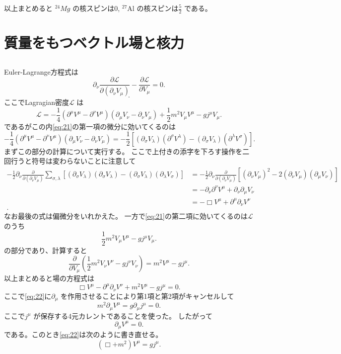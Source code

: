 \documentclass[dvipdfmx]{jsarticle}
\begin{document}
以上まとめると
$^{24}Mg$ の核スピンは0,
$\mathrm{^{27}Al}$ の核スピンは$\frac{5}{2}$ である。

\section{質量をもつベクトル場と核力}
\subsection{}
Euler-Lagrange方程式は
\begin{equation}
\label{eq:21}
\partial_\nu \frac{\partial \mathcal{L}}{\partial (\partial_\nu V_\mu)} -\frac{\partial \mathcal{L}}{\partial V_\mu} =0
.\end{equation}
\[
.\] 
ここでLagragian密度$\mathcal{L}$ は
\[
\mathcal{L}=-\frac{1}{4}(\partial^{\mu}V^{\mu}-\partial^{\nu}V^{\mu})(\partial_\mu V_\nu-\partial_\nu V_\mu)+\frac{1}{2}m^2V_\mu V^{\mu}-gj^{\mu}V_\mu
.\] 
であるがこの内\eqref{eq:21}の第一項の微分に効いてくるのは
\[
-\frac{1}{4}(\partial^{\mu}V^{\mu}-\partial^{\nu}V^{\mu})(\partial_\mu V_\nu-\partial_\nu V_\mu)=-\frac{1}{2}\left[ (\partial_\sigma V_\lambda)(\partial^{\sigma}V^{\lambda})-(\partial_\sigma V_\lambda)(\partial^{\lambda}V^{\sigma}) \right] 
.\] 
まずこの部分の計算について実行する。
ここで上付きの添字を下ろす操作を二回行うと符号は変わらないことに注意して
\begin{align*}
	-\frac{1}{2}\partial_\nu \frac{\partial }{\partial (\partial_\nu V_\mu)} \sum_{\sigma,\lambda}^{} \left[ (\partial_\sigma V_\lambda)(\partial_{\sigma}V_{\lambda})-(\partial_\sigma V_\lambda)(\partial_{\lambda}V_{\sigma}) \right] &=-\frac{1}{2}\partial_\nu \frac{\partial }{\partial (\partial_\nu V_\mu)} \left[ (\partial_\nu V_\mu)^2-2(\partial_\nu V_\mu)(\partial_\mu V_\nu) \right]   \\
	&= -\partial_\nu \partial^{\nu}V^{\mu}+\partial_\nu \partial_\mu V_\nu \\
	&= -\Box V^{\mu}+\partial^{\mu} \partial_\nu V^{\nu}\\
.\end{align*}
なお最後の式は偏微分をいれかえた。
一方で\eqref{eq:21}の第二項に効いてくるのは$\mathcal{L}$ のうち
\[
\frac{1}{2}m^2V_\mu V^{\mu}-gj^{\mu}V_\mu
.\] 
の部分であり、計算すると
\[
\frac{\partial }{\partial V_\mu} \left( \frac{1}{2}m^2V_\nu V^{\nu}-gj^{\nu}V_\nu \right) =m^2V^{\mu}-gj^{\mu}
.\] 
以上まとめると場の方程式は
\begin{equation}
\label{eq:22}
\Box V^{\mu}-\partial^{\mu}\partial_\nu V^{\nu}+m^2V^{\mu}-gj^{\mu}=0
.\end{equation}
ここで\eqref{eq:22}に$\partial_\mu$ を作用させることにより第1項と第2項がキャンセルして
\[
m^2\partial_\mu V^{\mu}=g\partial_\mu j^{\mu}=0
.\] 
ここで$j^{\mu}$ が保存する4元カレントであることを使った。
したがって
\[
\partial_\mu V^{\mu}=0
.\] 
である。このとき\eqref{eq:22}は次のように書き直せる。
\begin{equation}
\label{eq:23}
(\Box+m^2) V^{\mu}=gj^{\mu}
.\end{equation}
\end{document}
